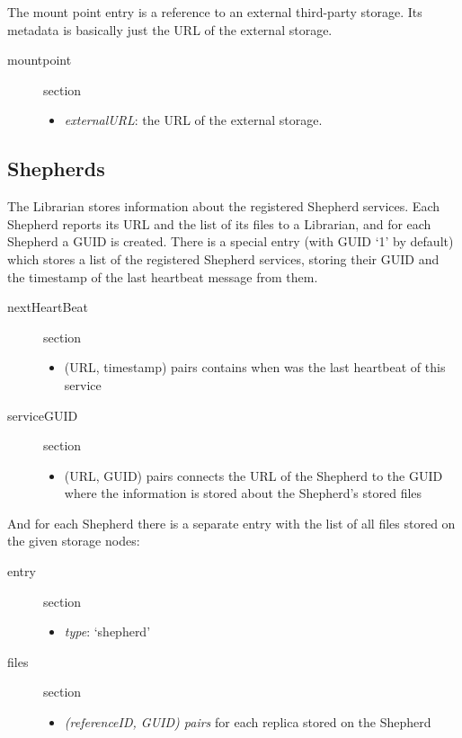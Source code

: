 \documentclass{book}
\begin{document}
The mount point entry is a reference to an external third-party storage. Its metadata is basically just the URL of the external storage.

\begin{description}
    \item [mountpoint] section 
    \begin{itemize}
        \item \emph{externalURL}: the URL of the external storage.
    \end{itemize}
\end{description}



\subsection{Shepherds} %
\label{sub:shepherds}

The Librarian stores information about the registered Shepherd services. Each Shepherd reports its URL and the list of its files to a Librarian, and for each Shepherd a GUID is created. There is a special entry (with GUID `1' by default) which stores a list of the registered Shepherd services, storing their GUID and the timestamp of the last heartbeat message from them.

\begin{description}
	\item [nextHeartBeat] section
	\begin{itemize}
		\item (URL, timestamp) pairs contains when was the last heartbeat of this service
	\end{itemize}
	\item [serviceGUID] section
    \begin{itemize}
        \item (URL, GUID) pairs connects the URL of the Shepherd to the GUID where the information is stored about the Shepherd's stored files
    \end{itemize}
\end{description}

And for each Shepherd there is a separate entry with the list of all files stored on the given storage nodes:

\begin{description}
	\item [entry] section
    \begin{itemize}
        \item \emph{type}: `shepherd'
    \end{itemize}
	\item [files] section
	\begin{itemize}
	    \item \emph{(referenceID, GUID) pairs} for each replica stored on the Shepherd
	\end{itemize}
\end{description}
\end{document}
